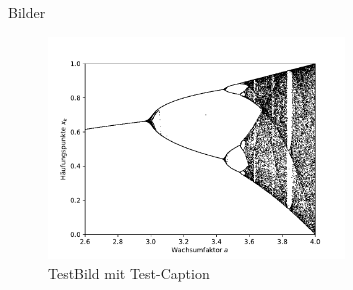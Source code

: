 \begin{frame}{Bilder}

\begin{figure}
  \centering
\includegraphics[width=0.7\textwidth]{feigenbaumdiagramm.pdf}
  \caption{TestBild mit Test-Caption}
  \label{fig: testfigure}
\end{figure}


\end{frame}


